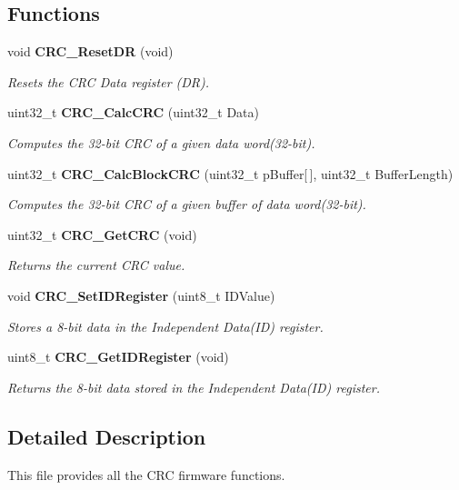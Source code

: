 \subsection*{Functions}
\begin{DoxyCompactItemize}
\item 
void \textbf{ C\+R\+C\+\_\+\+Reset\+DR} (void)
\begin{DoxyCompactList}\small\item\em Resets the C\+RC Data register (DR). \end{DoxyCompactList}\item 
uint32\+\_\+t \textbf{ C\+R\+C\+\_\+\+Calc\+C\+RC} (uint32\+\_\+t Data)
\begin{DoxyCompactList}\small\item\em Computes the 32-\/bit C\+RC of a given data word(32-\/bit). \end{DoxyCompactList}\item 
uint32\+\_\+t \textbf{ C\+R\+C\+\_\+\+Calc\+Block\+C\+RC} (uint32\+\_\+t p\+Buffer[$\,$], uint32\+\_\+t Buffer\+Length)
\begin{DoxyCompactList}\small\item\em Computes the 32-\/bit C\+RC of a given buffer of data word(32-\/bit). \end{DoxyCompactList}\item 
uint32\+\_\+t \textbf{ C\+R\+C\+\_\+\+Get\+C\+RC} (void)
\begin{DoxyCompactList}\small\item\em Returns the current C\+RC value. \end{DoxyCompactList}\item 
void \textbf{ C\+R\+C\+\_\+\+Set\+I\+D\+Register} (uint8\+\_\+t I\+D\+Value)
\begin{DoxyCompactList}\small\item\em Stores a 8-\/bit data in the Independent Data(\+I\+D) register. \end{DoxyCompactList}\item 
uint8\+\_\+t \textbf{ C\+R\+C\+\_\+\+Get\+I\+D\+Register} (void)
\begin{DoxyCompactList}\small\item\em Returns the 8-\/bit data stored in the Independent Data(\+I\+D) register. \end{DoxyCompactList}\end{DoxyCompactItemize}


\subsection{Detailed Description}
This file provides all the C\+RC firmware functions. 

